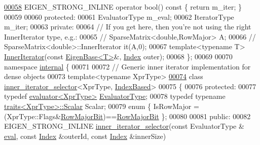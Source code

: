 \begin{DoxyCode}
\hyperlink{class_eigen_1_1_inner_iterator_a0f11df2dfcd1c48c54aa29e605c09310}{00058}   EIGEN\_STRONG\_INLINE \textcolor{keyword}{operator} bool()\textcolor{keyword}{ const         }\{ \textcolor{keywordflow}{return} m\_iter; \}
00059   
00060 \textcolor{keyword}{protected}:
00061   EvaluatorType m\_eval;
00062   IteratorType m\_iter;
00063 \textcolor{keyword}{private}:
00064   \textcolor{comment}{// If you get here, then you're not using the right InnerIterator type, e.g.:}
00065   \textcolor{comment}{//   SparseMatrix<double,RowMajor> A;}
00066   \textcolor{comment}{//   SparseMatrix<double>::InnerIterator it(A,0);}
00067   \textcolor{keyword}{template}<\textcolor{keyword}{typename} T> \hyperlink{class_eigen_1_1_inner_iterator}{InnerIterator}(\textcolor{keyword}{const} \hyperlink{group___core___module_struct_eigen_1_1_eigen_base}{EigenBase<T>}&,
      \hyperlink{namespace_eigen_a62e77e0933482dafde8fe197d9a2cfde}{Index} outer);
00068 \};
00069 
00070 \textcolor{keyword}{namespace }\hyperlink{namespaceinternal}{internal} \{
00071 
00072 \textcolor{comment}{// Generic inner iterator implementation for dense objects}
00073 \textcolor{keyword}{template}<\textcolor{keyword}{typename} XprType>
\hyperlink{class_eigen_1_1internal_1_1inner__iterator__selector_3_01_xpr_type_00_01_index_based_01_4}{00074} \textcolor{keyword}{class }\hyperlink{class_eigen_1_1internal_1_1inner__iterator__selector}{inner\_iterator\_selector}<XprType, \hyperlink{struct_eigen_1_1internal_1_1_index_based}{IndexBased}>
00075 \{
00076 \textcolor{keyword}{protected}:
00077   \textcolor{keyword}{typedef} \hyperlink{struct_eigen_1_1internal_1_1evaluator}{evaluator<XprType>} \hyperlink{struct_eigen_1_1internal_1_1evaluator}{EvaluatorType};
00078   \textcolor{keyword}{typedef} \textcolor{keyword}{typename} \hyperlink{struct_eigen_1_1internal_1_1traits}{traits<XprType>::Scalar} Scalar;
00079   \textcolor{keyword}{enum} \{ IsRowMajor = (XprType::Flags&\hyperlink{group__flags_gae4f56c2a60bbe4bd2e44c5b19cbe8762}{RowMajorBit})==\hyperlink{group__flags_gae4f56c2a60bbe4bd2e44c5b19cbe8762}{RowMajorBit} \};
00080   
00081 \textcolor{keyword}{public}:
00082   EIGEN\_STRONG\_INLINE \hyperlink{class_eigen_1_1internal_1_1inner__iterator__selector}{inner\_iterator\_selector}(\textcolor{keyword}{const} EvaluatorType &
      \hyperlink{struct_eigen_1_1internal_1_1eval}{eval}, \textcolor{keyword}{const} \hyperlink{namespace_eigen_a62e77e0933482dafde8fe197d9a2cfde}{Index} &outerId, \textcolor{keyword}{const} \hyperlink{namespace_eigen_a62e77e0933482dafde8fe197d9a2cfde}{Index} &innerSize)

\end{DoxyCode}
